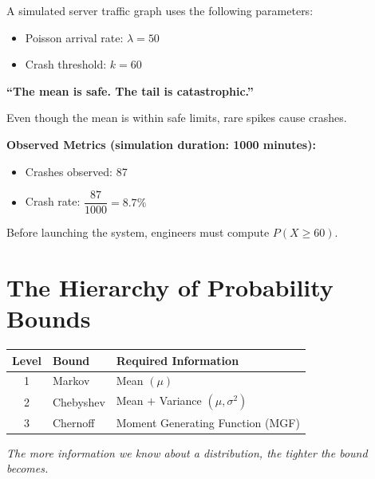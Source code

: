 \documentclass[12pt, a4paper]{article}
\begin{document}
A simulated server traffic graph uses the following parameters:
\begin{itemize}[leftmargin=2em]
  \item Poisson arrival rate: $\lambda = 50$
  \item Crash threshold: $k = 60$
\end{itemize}

\begin{tcolorbox}[colback=red!5, colframe=red!60!black, title=Key Observation]
  \textbf{``The mean is safe. The tail is catastrophic.''}
\end{tcolorbox}

Even though the mean is within safe limits, rare spikes cause crashes.

\medskip
\textbf{Observed Metrics (simulation duration: 1000 minutes):}
\begin{itemize}[leftmargin=2em]
  \item Crashes observed: 87
  \item Crash rate: $\dfrac{87}{1000} = 8.7\%$
\end{itemize}

Before launching the system, engineers must compute $P(X \geq 60)$.

\section{The Hierarchy of Probability Bounds}

\begin{center}
\begin{tabular}{cll}
  \toprule
  \textbf{Level} & \textbf{Bound}    & \textbf{Required Information} \\
  \midrule
  1              & Markov            & Mean $(\mu)$                  \\
  2              & Chebyshev         & Mean $+$ Variance $(\mu,\sigma^2)$ \\
  3              & Chernoff          & Moment Generating Function (MGF)   \\
  \bottomrule
\end{tabular}
\end{center}

\begin{tcolorbox}[colback=lightgray, colframe=accentblue]
  \textit{The more information we know about a distribution, the tighter the bound becomes.}
\end{tcolorbox}
\end{document}
